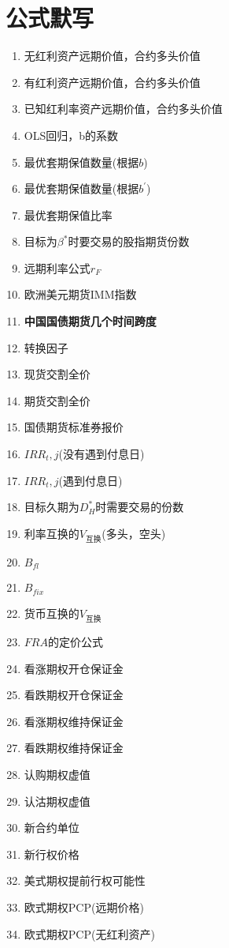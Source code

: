 \documentclass{article}
\begin{document}
\section{公式默写}
\begin{enumerate}
    \item 无红利资产远期价值，合约多头价值
    \item 有红利资产远期价值，合约多头价值
    \item 已知红利率资产远期价值，合约多头价值
    \item OLS回归，b的系数
    \item 最优套期保值数量(根据$b$)
    \item 最优套期保值数量(根据$b^{'}$)
    \item 最优套期保值比率
    \item 目标为$\beta^{*}$时要交易的股指期货份数
    \item 远期利率公式$r_F$
    \item 欧洲美元期货IMM指数
    \item \textbf{中国国债期货几个时间跨度}
    \item 转换因子
    \item 现货交割全价
    \item 期货交割全价
    \item 国债期货标准券报价
    \item $IRR_t,j$(没有遇到付息日)
    \item $IRR_t,j$(遇到付息日)
    \item 目标久期为$D_H^{*}$时需要交易的份数
    \item 利率互换的$V_\text{互换}$(多头，空头)
    \item $B_{fl}$
    \item $B_{fix}$
    \item 货币互换的$V_\text{互换}$
    \item $FRA$的定价公式
    \item 看涨期权开仓保证金
    \item 看跌期权开仓保证金
    \item 看涨期权维持保证金
    \item 看跌期权维持保证金
    \item 认购期权虚值
    \item 认沽期权虚值
    \item 新合约单位
    \item 新行权价格
    \item 美式期权提前行权可能性
    \item 欧式期权PCP(远期价格)
    \item 欧式期权PCP(无红利资产)

\end{enumerate}
\end{document}
